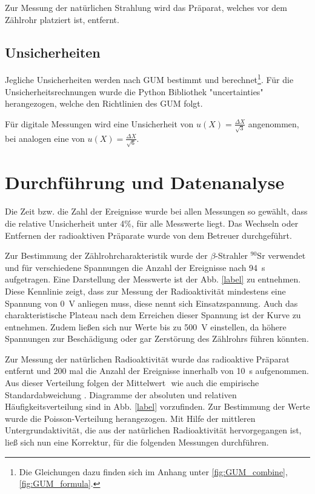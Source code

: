 		Zur Messung der natürlichen Strahlung wird das Präparat, welches vor dem Zählrohr platziert ist, entfernt.
				
	\subsection{Unsicherheiten}
	
		Jegliche Unsicherheiten werden nach GUM bestimmt und berechnet\footnote{Die Gleichungen dazu finden sich im Anhang unter \ref{fig:GUM_combine}, \ref{fig:GUM_formula}.}.
		Für die Unsicherheitsrechnungen wurde die Python Bibliothek "uncertainties" herangezogen, welche den Richtlinien des GUM folgt.
	
		Für digitale Messungen wird eine Unsicherheit von $u(X) = \frac{\Delta X}{\sqrt{3}}$ angenommen, bei analogen eine von $u(X) = \frac{\Delta X}{\sqrt{6}}$.

\section{Durchführung und Datenanalyse}
		
	Die Zeit bzw. die Zahl der Ereignisse wurde bei allen Messungen so gewählt, dass die relative Unsicherheit unter 4\%, für alle Messwerte liegt.
	Das Wechseln oder Entfernen der radioaktiven Präparate wurde von dem Betreuer durchgeführt.
	
	Zur Bestimmung der Zählrohrcharakteristik wurde der $\beta$-Strahler $^{90}$Sr verwendet und für verschiedene Spannungen die Anzahl der Ereignisse nach \SI{94}{\second} aufgetragen. %
	Eine Darstellung der Messwerte ist der Abb. \ref{label} zu entnehmen. %
	Diese Kennlinie zeigt, dass zur Messung der Radioaktivität mindestens eine Spannung von \SI{0}{\volt} anliegen muss, diese nennt sich Einsatzspannung. %
	Auch das charakteristische Plateau nach dem Erreichen dieser Spannung ist der Kurve zu entnehmen.
	Zudem ließen sich nur Werte bis zu \SI{500}{\volt} einstellen, da höhere Spannungen zur Beschädigung oder gar Zerstörung des Zählrohrs führen könnten. %
	
	Zur Messung der natürlichen Radioaktivität wurde das radioaktive Präparat entfernt und 200 mal die Anzahl der Ereignisse innerhalb von \SI{10}{\second} aufgenommen.
	Aus dieser Verteilung folgen der Mittelwert $ $ wie auch die empirische Standardabweichung $ $. %
	Diagramme der absoluten und relativen Häufigkeitsverteilung sind in Abb. \ref{label} vorzufinden. %
	Zur Bestimmung der Werte wurde die Poisson-Verteilung herangezogen. %
	Mit Hilfe der mittleren Untergrundaktivität, die aus der natürlichen Radioaktivität hervorgegangen ist, ließ sich nun eine Korrektur, für die folgenden Messungen durchführen.
	
